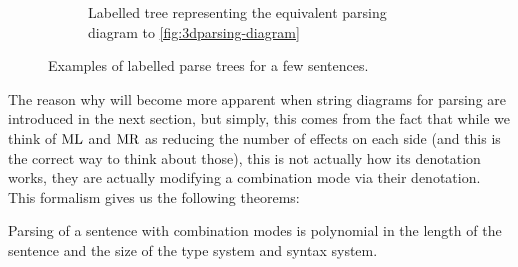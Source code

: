 \begin{figure}
	\begin{subfigure}{.45\textwidth}
		\centering
		\caption{Labelled tree representing the equivalent parsing diagram to
			\ref{fig:3dparsing-diagram}}
		\label{fig:tree-rain}
	\end{subfigure}
	\caption{Examples of labelled parse trees for a few sentences.}
	\label{fig:parsing-trees}
\end{figure}

The reason why will become more apparent when string diagrams for parsing are
introduced in the next section, but simply, this comes from the fact that while
we think of $\text{ML}$ and $\text{MR}$ as reducing the number of effects on each
side (and this is the correct way to think about those), this is not actually
how its denotation works, they are actually modifying a combination mode via
their denotation.
This formalism gives us the following theorems:

\begin{theorem}
	\label{thm:ptime-parse}
	Parsing of a sentence with combination modes is polynomial in the length of
	the	sentence and the size of the type system and syntax system.
\end{theorem}

